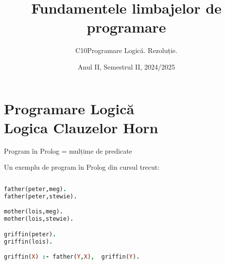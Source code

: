 \documentclass[xcolor=pdftex,romanian,colorlinks]{beamer}
\title[FLP]{Fundamentele limbajelor de programare}
\subtitle{C10}
\date{Anul II, Semestrul II, 2024/2025}
\institute{Facultatea de Matematică și Informatică, DL Info}
\subtitle{Programare Logică. Rezoluție.}
\begin{document}
\begin{frame}
  \titlepage
\end{frame}

\setlength{\leftmargini}{12pt}




\section{\color{section-color}Programare Logică \\ Logica Clauzelor Horn}  

\begin{frame}[fragile]{Program  în Prolog = mulțime de predicate}

Un exemplu de \alert{program în Prolog} din cursul trecut:
 
\begin{columns}
\begin{column}{.5\textwidth}
\vspace{-.2cm}
\begin{lstlisting}[language=Prolog]
father(peter,meg). 
father(peter,stewie).

mother(lois,meg). 
mother(lois,stewie).

griffin(peter).
griffin(lois).

griffin(X) :- father(Y,X),  griffin(Y).
\end{lstlisting}
\end{column}
\begin{column}{.3\textwidth}
\\
\\
\\
\end{column}
\end{columns}

\end{frame}



\end{document}

